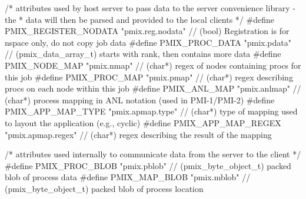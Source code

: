 \begin{codepar}
/* attributes used by host server to pass data to the server convenience library - the
 * data will then be parsed and provided to the local clients */
#define PMIX_REGISTER_NODATA                "pmix.reg.nodata"       // (bool) Registration is for nspace only, do not copy job data
#define PMIX_PROC_DATA                      "pmix.pdata"            // (pmix_data_array_t) starts with rank, then contains more data
#define PMIX_NODE_MAP                       "pmix.nmap"             // (char*) regex of nodes containing procs for this job
#define PMIX_PROC_MAP                       "pmix.pmap"             // (char*) regex describing procs on each node within this job
#define PMIX_ANL_MAP                        "pmix.anlmap"           // (char*) process mapping in ANL notation (used in PMI-1/PMI-2)
#define PMIX_APP_MAP_TYPE                   "pmix.apmap.type"       // (char*) type of mapping used to layout the application (e.g., cyclic)
#define PMIX_APP_MAP_REGEX                  "pmix.apmap.regex"      // (char*) regex describing the result of the mapping


/* attributes used internally to communicate data from the server to the client */
#define PMIX_PROC_BLOB                      "pmix.pblob"            // (pmix_byte_object_t) packed blob of process data
#define PMIX_MAP_BLOB                       "pmix.mblob"            // (pmix_byte_object_t) packed blob of process location



\end{codepar}
